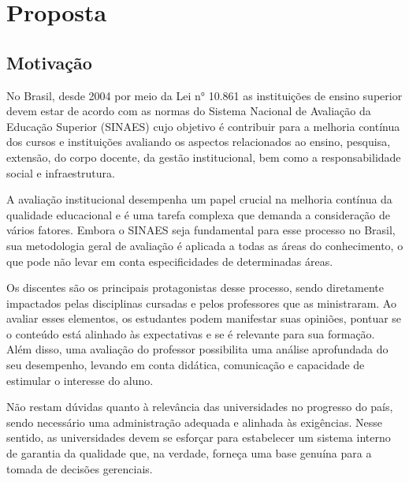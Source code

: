 \chapter{Proposta}\label{chp:PROPOSTA}


\section{Motivação}


No Brasil, desde 2004 por meio da Lei n° 10.861 as instituições de ensino superior devem estar de acordo com as normas do Sistema Nacional de Avaliação da Educação Superior (SINAES)
cujo objetivo é contribuir para a melhoria contínua dos cursos e instituições avaliando 
os aspectos relacionados ao ensino, pesquisa, extensão, do corpo docente, da gestão institucional, bem como a responsabilidade social e infraestrutura.


A avaliação institucional desempenha um papel crucial na melhoria contínua da qualidade educacional
e é uma tarefa complexa que demanda a consideração de vários fatores. Embora o SINAES seja fundamental para esse processo no Brasil, sua metodologia geral de avaliação é aplicada a todas as áreas do conhecimento, o que pode não levar em conta especificidades de determinadas áreas.


Os discentes são os principais protagonistas desse processo, sendo diretamente impactados pelas disciplinas cursadas e pelos professores que as ministraram. Ao avaliar esses elementos, os estudantes podem manifestar suas opiniões, pontuar se o conteúdo está alinhado às expectativas e se é relevante para sua formação. Além disso, uma avaliação do professor possibilita uma análise aprofundada do seu desempenho, levando em conta didática, comunicação e capacidade de estimular o interesse do aluno.



Não restam dúvidas quanto à relevância das universidades no progresso do país, sendo necessário uma administração adequada e alinhada às exigências. Nesse sentido, as universidades devem se esforçar para estabelecer um sistema interno de garantia da qualidade que, na verdade, forneça uma base genuína para a tomada de decisões gerenciais. 

